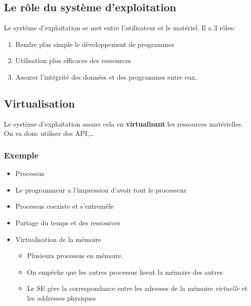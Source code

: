 \subsection{Le rôle du système
d'exploitation}\label{le-ruxf4le-du-systuxe8me-dexploitation}

Le système d'exploitation se met entre l'utilisateur et le matériel. Il
a 3 rôles:

\begin{enumerate}
\def\labelenumi{\arabic{enumi}.}
\tightlist
\item
  Rendre plus simple le développement de programmes
\item
  Utilisation plus efficaces des ressources
\item
  Assurer l'intégrité des données et des programmes entre eux.
\end{enumerate}

\subsection{Virtualisation}\label{virtualisation}

Le système d'exploitation assure cela en \textbf{virtualisant} les
ressources matérielles. On va donc utiliser des API,\ldots{}

\subsubsection{Exemple}\label{exemple}

\begin{itemize}
\tightlist
\item
  Processus
\item
  Le programmeur a l'impression d'avoir tout le processeur
\item
  Processus coexiste et s'entremêle
\item
  Partage du temps et des ressources
\item
  Virtualisation de la mémoire

  \begin{itemize}
  \tightlist
  \item
    Plusieurs processus en mémoire.
  \item
    On empêche que les autres processus lisent la mémoire des autres
  \item
    Le SE gère la correspondance entre les adresses de la mémoire
    \emph{virtuelle} et les addresses physiques
  \end{itemize}
\end{itemize}

